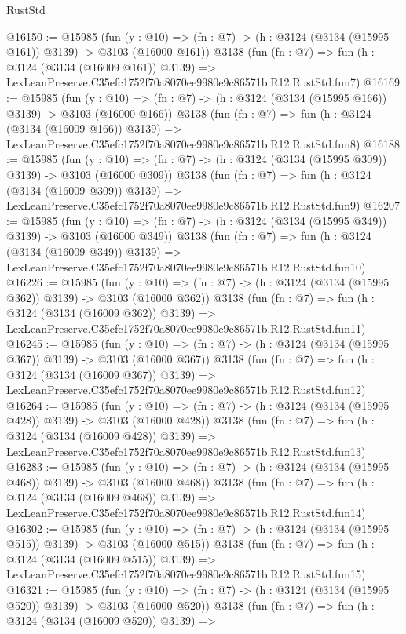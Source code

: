 \begin{lexlean}{RustStd}
\begin{coremodule}
@16150 := @15985
    (fun (y : @10) => (fn : @7) -> (h : @3124 (@3134 (@15995 @161)) @3139) -> @3103 (@16000 @161))
    @3138
    (fun (fn : @7) =>
    fun (h : @3124 (@3134 (@16009 @161)) @3139) =>
    LexLeanPreserve.C35efc1752f70a8070ee9980e9c86571b.R12.RustStd.fun7)
@16169 := @15985
    (fun (y : @10) => (fn : @7) -> (h : @3124 (@3134 (@15995 @166)) @3139) -> @3103 (@16000 @166))
    @3138
    (fun (fn : @7) =>
    fun (h : @3124 (@3134 (@16009 @166)) @3139) =>
    LexLeanPreserve.C35efc1752f70a8070ee9980e9c86571b.R12.RustStd.fun8)
@16188 := @15985
    (fun (y : @10) => (fn : @7) -> (h : @3124 (@3134 (@15995 @309)) @3139) -> @3103 (@16000 @309))
    @3138
    (fun (fn : @7) =>
    fun (h : @3124 (@3134 (@16009 @309)) @3139) =>
    LexLeanPreserve.C35efc1752f70a8070ee9980e9c86571b.R12.RustStd.fun9)
@16207 := @15985
    (fun (y : @10) => (fn : @7) -> (h : @3124 (@3134 (@15995 @349)) @3139) -> @3103 (@16000 @349))
    @3138
    (fun (fn : @7) =>
    fun (h : @3124 (@3134 (@16009 @349)) @3139) =>
    LexLeanPreserve.C35efc1752f70a8070ee9980e9c86571b.R12.RustStd.fun10)
@16226 := @15985
    (fun (y : @10) => (fn : @7) -> (h : @3124 (@3134 (@15995 @362)) @3139) -> @3103 (@16000 @362))
    @3138
    (fun (fn : @7) =>
    fun (h : @3124 (@3134 (@16009 @362)) @3139) =>
    LexLeanPreserve.C35efc1752f70a8070ee9980e9c86571b.R12.RustStd.fun11)
@16245 := @15985
    (fun (y : @10) => (fn : @7) -> (h : @3124 (@3134 (@15995 @367)) @3139) -> @3103 (@16000 @367))
    @3138
    (fun (fn : @7) =>
    fun (h : @3124 (@3134 (@16009 @367)) @3139) =>
    LexLeanPreserve.C35efc1752f70a8070ee9980e9c86571b.R12.RustStd.fun12)
@16264 := @15985
    (fun (y : @10) => (fn : @7) -> (h : @3124 (@3134 (@15995 @428)) @3139) -> @3103 (@16000 @428))
    @3138
    (fun (fn : @7) =>
    fun (h : @3124 (@3134 (@16009 @428)) @3139) =>
    LexLeanPreserve.C35efc1752f70a8070ee9980e9c86571b.R12.RustStd.fun13)
@16283 := @15985
    (fun (y : @10) => (fn : @7) -> (h : @3124 (@3134 (@15995 @468)) @3139) -> @3103 (@16000 @468))
    @3138
    (fun (fn : @7) =>
    fun (h : @3124 (@3134 (@16009 @468)) @3139) =>
    LexLeanPreserve.C35efc1752f70a8070ee9980e9c86571b.R12.RustStd.fun14)
@16302 := @15985
    (fun (y : @10) => (fn : @7) -> (h : @3124 (@3134 (@15995 @515)) @3139) -> @3103 (@16000 @515))
    @3138
    (fun (fn : @7) =>
    fun (h : @3124 (@3134 (@16009 @515)) @3139) =>
    LexLeanPreserve.C35efc1752f70a8070ee9980e9c86571b.R12.RustStd.fun15)
@16321 := @15985
    (fun (y : @10) => (fn : @7) -> (h : @3124 (@3134 (@15995 @520)) @3139) -> @3103 (@16000 @520))
    @3138
    (fun (fn : @7) =>
    fun (h : @3124 (@3134 (@16009 @520)) @3139) =>

\end{coremodule}
\end{lexlean}
